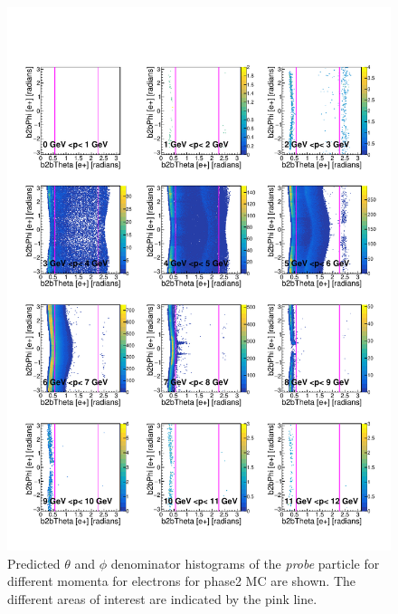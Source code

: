 \documentclass[a4paper,11pt,twosided,final,german,openbib,pdftex,listof=totoc,bibliography=totoc]{scrbook}
\begin{document}
\begin{appendix}
\begin{figure}[h!]
	\includegraphics[width=\textwidth]{Plots/RTPMemD_MC.pdf}
	\caption[Denominator $\theta$, $\phi$ Electron Momentum MC]{Predicted $\theta$ and $\phi$ denominator histograms of the \textit{probe} particle for different momenta for electrons for phase2 MC are shown. The different areas of interest are indicated by the pink line.}
	\label{plt:RTPMemD_MC}
\end{figure}




\end{appendix}
\end{document}

